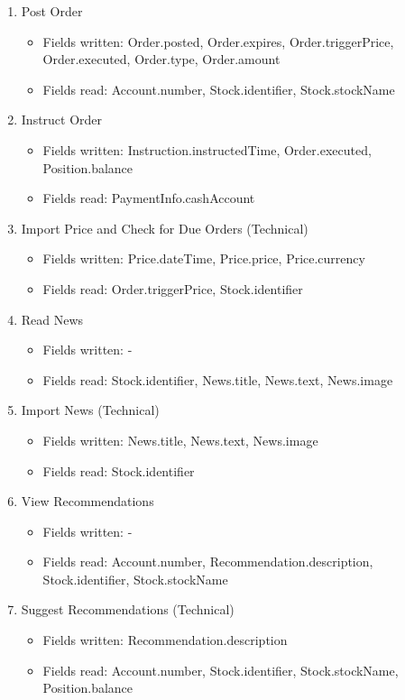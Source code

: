 \begin{enumerate}
\item Post Order
	\begin{itemize}
	\item Fields written: Order.posted,  Order.expires, Order.triggerPrice, Order.executed, Order.type, Order.amount
	\item Fields read: Account.number, Stock.identifier, Stock.stockName
	\end{itemize}
\item Instruct Order
	\begin{itemize}
	\item Fields written: Instruction.instructedTime, Order.executed, Position.balance
	\item Fields read: PaymentInfo.cashAccount
	\end{itemize}
\item Import Price and Check for Due Orders (Technical)
	\begin{itemize}
	\item Fields written: Price.dateTime, Price.price, Price.currency
	\item Fields read: Order.triggerPrice, Stock.identifier
	\end{itemize}
\item Read News
	\begin{itemize}
	\item Fields written: - 
	\item Fields read: Stock.identifier, News.title, News.text, News.image
	\end{itemize}
\item Import News (Technical)
	\begin{itemize}
	\item Fields written: News.title, News.text, News.image
	\item Fields read: Stock.identifier
	\end{itemize}
\item View Recommendations
	\begin{itemize}
	\item Fields written: -
	\item Fields read: Account.number, Recommendation.description, Stock.identifier, Stock.stockName
	\end{itemize}
\item Suggest Recommendations (Technical)
	\begin{itemize}
	\item Fields written: Recommendation.description
	\item Fields read: Account.number, Stock.identifier, Stock.stockName, Position.balance

\end{itemize}
\end{enumerate}
